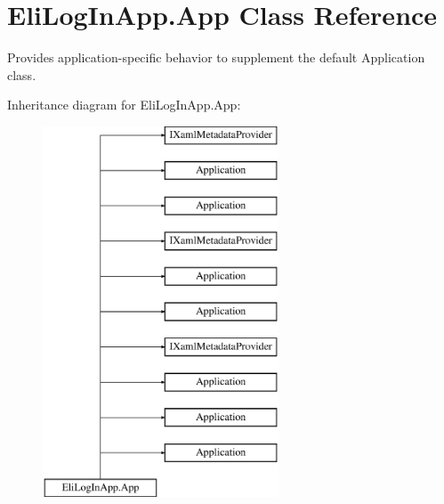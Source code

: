 \hypertarget{class_eli_log_in_app_1_1_app}{}\section{Eli\+Log\+In\+App.\+App Class Reference}
\label{class_eli_log_in_app_1_1_app}


Provides application-\/specific behavior to supplement the default Application class.  


Inheritance diagram for Eli\+Log\+In\+App.\+App\+:\begin{figure}[H]
\begin{center}
\leavevmode
\includegraphics[height=11.000000cm]{d0/d27/class_eli_log_in_app_1_1_app}
\end{center}
\end{figure}
